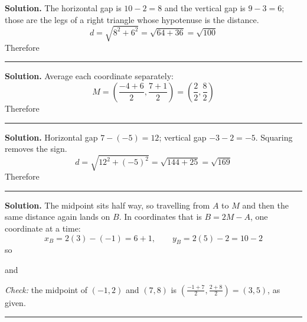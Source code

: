 \documentclass[12pt]{article}
\begin{document}




\noindent\textbf{Solution.} The horizontal gap is $10 - 2 = 8$ and the vertical
gap is $9 - 3 = 6$; those are the legs of a right triangle whose hypotenuse is
the distance.
\[ d = \sqrt{8^2 + 6^2} = \sqrt{64 + 36} = \sqrt{100} \]
Therefore 

\vspace{0.15cm}\noindent\rule{\linewidth}{0.2pt}


\noindent\textbf{Solution.} Average each coordinate separately:
\[ M = \left( \frac{-4+6}{2}, \frac{7+1}{2} \right)
     = \left( \frac{2}{2}, \frac{8}{2} \right) \]
Therefore 

\vspace{0.15cm}\noindent\rule{\linewidth}{0.2pt}


\noindent\textbf{Solution.} Horizontal gap $7 - (-5) = 12$; vertical gap
$-3 - 2 = -5$. Squaring removes the sign.
\[ d = \sqrt{12^2 + (-5)^2} = \sqrt{144 + 25} = \sqrt{169} \]
Therefore 

\vspace{0.15cm}\noindent\rule{\linewidth}{0.2pt}


\noindent\textbf{Solution.} The midpoint sits half way, so travelling from $A$
to $M$ and then the same distance again lands on $B$. In coordinates that is
$B = 2M - A$, one coordinate at a time:
\[ x_B = 2(3) - (-1) = 6 + 1, \qquad y_B = 2(5) - 2 = 10 - 2 \]
so 

\noindent and 

\noindent\textit{Check:} the midpoint of $(-1,2)$ and $(7,8)$ is
$\left(\frac{-1+7}{2}, \frac{2+8}{2}\right) = (3,5)$, as given.

\vspace{0.15cm}\noindent\rule{\linewidth}{0.2pt}

\end{document}
